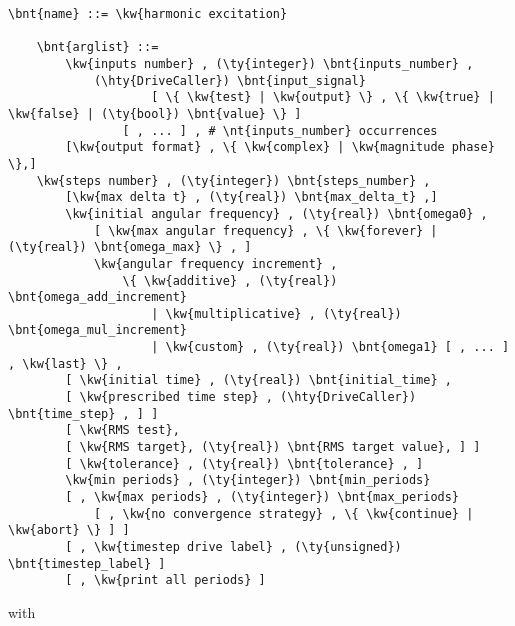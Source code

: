 \begin{Verbatim}[commandchars=\\\{\}]
    \bnt{name} ::= \kw{harmonic excitation}

    \bnt{arglist} ::=
        \kw{inputs number} , (\ty{integer}) \bnt{inputs_number} ,
            (\hty{DriveCaller}) \bnt{input_signal}
                    [ \{ \kw{test} | \kw{output} \} , \{ \kw{true} | \kw{false} | (\ty{bool}) \bnt{value} \} ]
                [ , ... ] , # \nt{inputs_number} occurrences
        [\kw{output format} , \{ \kw{complex} | \kw{magnitude phase} \},]
	\kw{steps number} , (\ty{integer}) \bnt{steps_number} ,
        [\kw{max delta t} , (\ty{real}) \bnt{max_delta_t} ,]
        \kw{initial angular frequency} , (\ty{real}) \bnt{omega0} ,
            [ \kw{max angular frequency} , \{ \kw{forever} | (\ty{real}) \bnt{omega_max} \} , ]
            \kw{angular frequency increment} ,
                \{ \kw{additive} , (\ty{real}) \bnt{omega_add_increment}
                    | \kw{multiplicative} , (\ty{real}) \bnt{omega_mul_increment}
                    | \kw{custom} , (\ty{real}) \bnt{omega1} [ , ... ] , \kw{last} \} ,
        [ \kw{initial time} , (\ty{real}) \bnt{initial_time} ,
	    [ \kw{prescribed time step} , (\hty{DriveCaller}) \bnt{time_step} , ] ]
        [ \kw{RMS test}, 
	    [ \kw{RMS target}, (\ty{real}) \bnt{RMS target value}, ] ]
        [ \kw{tolerance} , (\ty{real}) \bnt{tolerance} , ]
        \kw{min periods} , (\ty{integer}) \bnt{min_periods}
        [ , \kw{max periods} , (\ty{integer}) \bnt{max_periods}
            [ , \kw{no convergence strategy} , \{ \kw{continue} | \kw{abort} \} ] ]
        [ , \kw{timestep drive label} , (\ty{unsigned}) \bnt{timestep_label} ]
        [ , \kw{print all periods} ]
\end{Verbatim}
with
